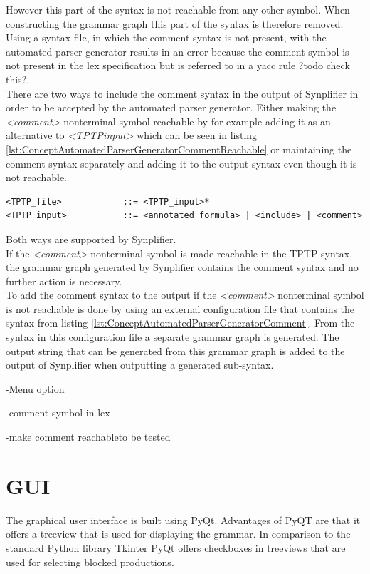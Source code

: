 However this part of the syntax is not reachable from any other symbol.
When constructing the grammar graph this part of the syntax is therefore removed.\\
Using a syntax file, in which the comment syntax is not present, with the automated parser generator results in an error because the comment symbol is not present in the lex specification but is referred to in a yacc rule ?todo check this?.\\
There are two ways to include the comment syntax in the output of \ac{Synplifier} in order to be accepted by the automated parser generator.
Either making the \textit{<comment>} nonterminal symbol reachable by for example adding it as an alternative to \textit{<TPTP\textunderscore input>} which can be seen in listing \ref{lst:ConceptAutomatedParserGeneratorCommentReachable} or maintaining the comment syntax separately and adding it to the output syntax even though it is not reachable.
\begin{lstlisting}[language=none, basicstyle=\scriptsize, caption=Making the comment syntax reachable, label= lst:ConceptAutomatedParserGeneratorCommentReachable]
<TPTP_file>            ::= <TPTP_input>*
<TPTP_input>           ::= <annotated_formula> | <include> | <comment>
\end{lstlisting}

Both ways are supported by \ac{Synplifier}.\\
If the \textit{<comment>} nonterminal symbol is made reachable in the \ac{TPTP} syntax, the grammar graph generated by \ac{Synplifier} contains the comment syntax and no further action is necessary.\\
To add the comment syntax to the output if the \textit{<comment>} nonterminal symbol is not reachable is done by using an external configuration file that contains the syntax from listing \ref{lst:ConceptAutomatedParserGeneratorComment}.
From the syntax in this configuration file a separate grammar graph is generated. The output string that can be generated from this grammar graph is added to the output of \ac{Synplifier} when outputting a generated sub-syntax.

-Menu option

-comment symbol in lex

-make comment reachableto be tested
\section{GUI}\label{sec:ConceptGUI}
The graphical user interface is built using PyQt. Advantages of PyQT are that it offers a treeview that is used for displaying the grammar. In comparison to the standard Python library Tkinter PyQt offers checkboxes in treeviews \cite{Tkinter} that are used for selecting blocked productions.

